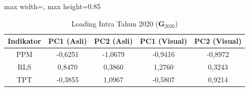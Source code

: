 \begin{table}[H]
\centering
\caption{Loading Intra Tahun 2020 ($\mathbf{G}_{2020}$)} \label{tab:sample2loading_intra_2020}
\begin{adjustbox}{max width=\textwidth, max height=0.85\textheight}
\begin{tabular}{|c|c|c|c|c|}
\hline
\textbf{Indikator} & \textbf{PC1 (Asli)} & \textbf{PC2 (Asli)} & \textbf{PC1 (Visual)} & \textbf{PC2 (Visual)} \\
\hline
PPM & -0,6251 & -1,0679 & -0,9416 & -0,8972 \\
RLS & 0,8470 & 0,3860 & 1,2760 & 0,3243 \\
TPT & -0,3855 & 1,0967 & -0,5807 & 0,9214 \\
\hline
\end{tabular}
\end{adjustbox}
\end{table}